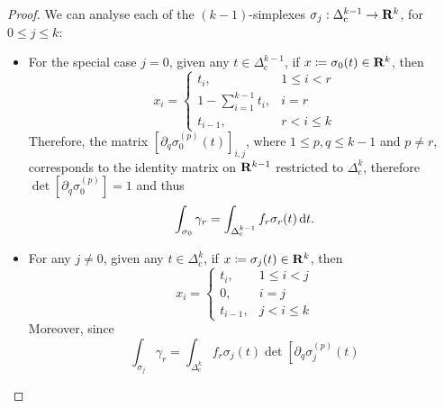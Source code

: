 \begin{proof}
    We can analyse each of the \((k-1)\)-simplexes \(\sigma_j: \Delta_{\text{c}}^{k-1}
    \to \mathbf{R}^k\), for \(0 \leq j \leq k\):
    \begin{itemize}\setlength\itemsep{0em}
        \item For the special case \(j = 0\), given any \(t \in
              \Delta_{\text{c}}^{k-1}\), if \(x \coloneq \sigma_0(t) \in \mathbf{R}^k\), then
              \begin{equation}
                  \label{eq:stokes-sigma-0}
                  x_i =
                  \begin{cases}
                      t_i,                      & 1 \leq i < r \\
                      1 - \sum_{i=1}^{k-1} t_i, & i = r        \\
                      t_{i-1},                  & r < i \leq k
                  \end{cases}
              \end{equation}
              Therefore, the matrix \([\partial_q \sigma_0^{(p)}(t)]_{i, j}\), where \(1
              \leq p, q \leq k - 1\) and \(p \neq r\), corresponds to the identity matrix on
              \(\mathbf{R}^{k-1}\) restricted to \(\Delta_{\text{c}}^k\), therefore \(\det [\partial_q
                  \sigma_0^{(p)}] = 1\) and thus
              \begin{equation}\label{eq:sigma-0-stokes}
                  \int_{\sigma_0} \gamma_r
                  = \int_{\Delta_{\text{c}}^{k-1}} f_r\sigma_r(t)\, \mathrm{d} t.
              \end{equation}
        \item For any \(j \neq 0\), given any \(t \in \Delta_{\text{c}}^k\), if \(x
              \coloneq \sigma_j(t) \in \mathbf{R}^k\), then
              \begin{equation}
                  \label{eq:stokes-sigma-j}
                  x_i =
                  \begin{cases}
                      t_i,     & 1 \leq i < j \\
                      0,       & i = j        \\
                      t_{i-1}, & j < i \leq k
                  \end{cases}
              \end{equation}
              Moreover, since
              \[
                  \int_{\sigma_j} \gamma_r
                  = \int_{\Delta_{\text{c}}^k} f_r\sigma_j(t)
                  \det{\left[
                          \partial_q \sigma_j^{(p)}(t)
}\]
\end{itemize}
\end{proof}

